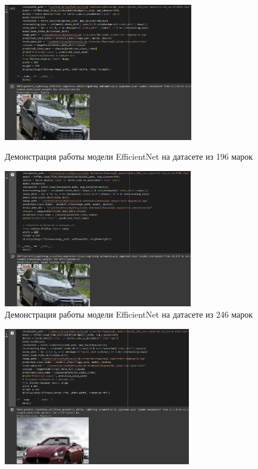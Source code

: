 \documentclass[14pt]{extarticle}
\begin{document}
\begin{figure}[H]
\centering
\begin{minipage}{0.49\textwidth}
  \centering
  \includegraphics[height=6cm]{images/22.png}  
  \caption{Демонстрация работы модели \foreignlanguage{english}{EfficientNet} на датасете из 196 марок}
  \label{fig:12}
\end{minipage}
\hfill
\begin{minipage}{0.49\textwidth}
  \centering
  \includegraphics[height=6cm]{images/23.png}  
  \caption{Демонстрация работы модели \foreignlanguage{english}{EfficientNet} на датасете из 246 марок}
  \label{fig:13}
\end{minipage}
\end{figure}\begin{figure}[H]
\centering
\begin{minipage}{0.49\textwidth}
  \centering
  \includegraphics[height=6cm]{images/24.png}  

\end{minipage}
\end{figure}
\end{document}
